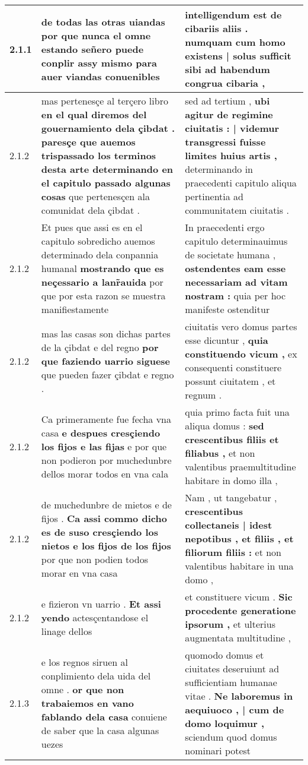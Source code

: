 \begin{tabular}{|p{1cm}|p{6.5cm}|p{6.5cm}|}
2.1.1 & de todas las otras uiandas \textbf{ por que nunca el omne estando señero puede conplir assy mismo } para auer viandas conuenibles & intelligendum est de cibariis aliis . \textbf{ numquam cum homo existens | solus sufficit sibi } ad habendum congrua cibaria , \\\hline
2.1.2 & mas pertenesçe al terçero libro \textbf{ en el qual diremos del gouernamiento dela çibdat . paresçe que auemos trispassado los terminos desta arte determinando en el capitulo passado algunas cosas } que pertenesçen ala comunidat dela çibdat . & sed ad tertium , \textbf{ ubi agitur de regimine ciuitatis : | videmur transgressi fuisse limites huius artis , } determinando in praecedenti capitulo aliqua pertinentia ad communitatem ciuitatis . \\\hline
2.1.2 & Et pues que assi es en el capitulo sobredicho auemos determinado dela conpannia humanal \textbf{ mostrando que es neçessario a lanr̃auida } por que por esta razon se muestra manifiestamente & In praecedenti ergo capitulo determinauimus de societate humana , \textbf{ ostendentes eam esse necessariam ad vitam nostram : } quia per hoc manifeste ostenditur \\\hline
2.1.2 & mas las casas son dichas partes de la çibdat e del regno \textbf{ por que faziendo uarrio siguese } que pueden fazer çibdat e regno . & ciuitatis vero domus partes esse dicuntur , \textbf{ quia constituendo vicum , } ex consequenti constituere possunt ciuitatem , et regnum . \\\hline
2.1.2 & Ca primeramente fue fecha vna casa \textbf{ e despues cresçiendo los fijos e las fijas } e por que non podieron por muchedunbre dellos morar todos en vna cala & quia primo facta fuit una aliqua domus : \textbf{ sed crescentibus filiis et filiabus , } et non valentibus praemultitudine habitare in domo illa , \\\hline
2.1.2 & de muchedunbre de mietos e de fijos . \textbf{ Ca assi commo dicho es de suso cresçiendo los nietos e los fijos de los fijos } por que non podien todos morar en vna casa & Nam , ut tangebatur , \textbf{ crescentibus collectaneis | idest nepotibus , et filiis , et filiorum filiis : } et non valentibus habitare in una domo , \\\hline
2.1.2 & e fizieron vn uarrio . \textbf{ Et assi yendo } actesçentandose el linage dellos & et constituere vicum . \textbf{ Sic procedente generatione ipsorum , } et ulterius augmentata multitudine , \\\hline
2.1.3 & e los regnos siruen al conplimiento dela uida del omne . \textbf{ or que non trabaiemos en vano fablando dela casa } conuiene de saber que la casa algunas uezes & quomodo domus et ciuitates deseruiunt ad sufficientiam humanae vitae . \textbf{ Ne laboremus in aequiuoco , | cum de domo loquimur , } sciendum quod domus nominari potest \\\hline

\end{tabular}
